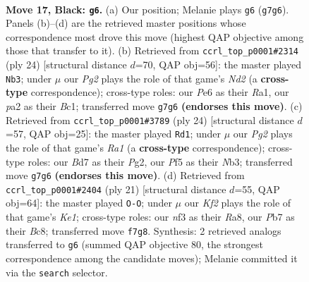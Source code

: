\documentclass[11pt]{article}
\begin{document}
\clearpage

\begin{figure}[p]\centering
\begin{subfigure}{0.46\textwidth}\centering
\resizebox{\linewidth}{!}{%
\newchessgame
\chessboard[
  setfen={1r3b1r/1p1b1kpp/p1n1p3/4Pp2/n7/4BNP1/PP1N1P1P/R1K2BR1 b - - 3 17},
  showmover=false,
  pgfstyle=straightmove, color=movearrow, markmove={g7-g6}
]}
\caption{}
\end{subfigure}\hfill
\begin{subfigure}{0.46\textwidth}\centering
\resizebox{\linewidth}{!}{%
\newchessgame
\chessboard[
  setfen={rn5r/4kppp/p1b1pn2/1pb5/8/2N1P3/PP1NBPPP/R1BR2K1 w - - 4 13},
  showmover=false,
  pgfstyle=straightmove, color=movearrow, markmove={d2-b3}
]}
\caption{}
\end{subfigure}
\\[4pt]
\begin{subfigure}{0.46\textwidth}\centering
\resizebox{\linewidth}{!}{%
\newchessgame
\chessboard[
  setfen={rnbr2k1/p3bppp/1pn1p3/8/4P3/PNN1B3/1P3PPP/R3KB1R w KQ - 0 13},
  showmover=false,
  pgfstyle=straightmove, color=movearrow, markmove={a1-d1}
]}
\caption{}
\end{subfigure}\hfill
\begin{subfigure}{0.46\textwidth}\centering
\resizebox{\linewidth}{!}{%
\newchessgame
\chessboard[
  setfen={r1b1k2r/1p2bppp/p1n1pn2/8/1PB5/P3PN2/3N1PPP/R1BR2K1 b kq - 2 11},
  showmover=false,
  pgfstyle=straightmove, color=movearrow, markmove={e8-g8}
]}
\caption{}
\end{subfigure}
\caption{\textbf{Move 17, Black: \texttt{g6}.} (a) Our position; Melanie plays \texttt{g6} (\texttt{g7g6}). Panels (b)--(d) are the retrieved master positions whose correspondence most drove this move (highest QAP objective among those that transfer to it). (b) Retrieved from \texttt{ccrl\_top\_p0001\#2314} (ply 24) [structural distance $d$=70, QAP obj=56]: the master played \texttt{Nb3}; under $\mu$ our \emph{Pg2} plays the role of that game's \emph{Nd2} (a \textbf{cross-type} correspondence); cross-type roles: our \emph{P}e6 as their \emph{R}a1, our \emph{p}a2 as their \emph{B}c1; transferred move \texttt{g7g6} \textbf{(endorses this move)}. (c) Retrieved from \texttt{ccrl\_top\_p0001\#3789} (ply 24) [structural distance $d$=57, QAP obj=25]: the master played \texttt{Rd1}; under $\mu$ our \emph{Pg2} plays the role of that game's \emph{Ra1} (a \textbf{cross-type} correspondence); cross-type roles: our \emph{B}d7 as their \emph{P}g2, our \emph{P}f5 as their \emph{N}b3; transferred move \texttt{g7g6} \textbf{(endorses this move)}. (d) Retrieved from \texttt{ccrl\_top\_p0001\#2404} (ply 21) [structural distance $d$=55, QAP obj=64]: the master played \texttt{O-O}; under $\mu$ our \emph{Kf2} plays the role of that game's \emph{Ke1}; cross-type roles: our \emph{n}f3 as their \emph{R}a8, our \emph{P}b7 as their \emph{B}c8; transferred move \texttt{f7g8}. Synthesis: 2 retrieved analogs transferred to \texttt{g6} (summed QAP objective 80, the strongest correspondence among the candidate moves); Melanie committed it via the \texttt{search} selector.}
\label{fig:thought-m33}
\end{figure}
\end{document}
